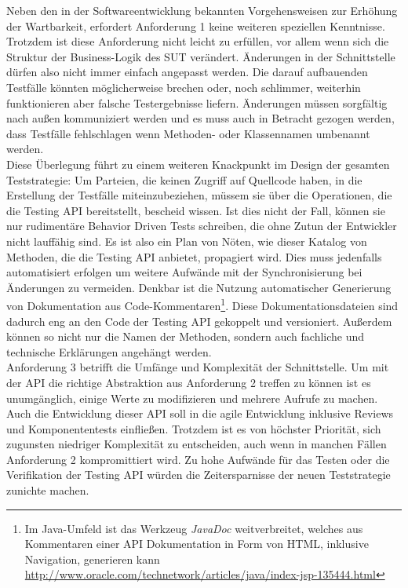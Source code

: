 Neben den in der Softwareentwicklung bekannten Vorgehensweisen zur Erhöhung der Wartbarkeit, erfordert Anforderung 1 keine weiteren speziellen Kenntnisse. Trotzdem ist diese Anforderung nicht leicht zu erfüllen, vor allem wenn sich die Struktur der Business-Logik des \Gls{SUT} verändert. Änderungen in der Schnittstelle dürfen also nicht immer einfach angepasst werden. Die darauf aufbauenden Testfälle könnten möglicherweise brechen oder, noch schlimmer, weiterhin funktionieren aber falsche Testergebnisse liefern. Änderungen müssen sorgfältig nach außen kommuniziert werden und es muss auch in Betracht gezogen werden, dass Testfälle fehlschlagen wenn Methoden- oder Klassennamen umbenannt werden.\\
Diese Überlegung führt zu einem weiteren Knackpunkt im Design der gesamten Teststrategie: Um Parteien, die keinen Zugriff auf Quellcode haben, in die Erstellung der Testfälle miteinzubeziehen, müssem sie über die Operationen, die die Testing API bereitstellt, bescheid wissen. Ist dies nicht der Fall, können sie nur rudimentäre Behavior Driven Tests schreiben, die ohne Zutun der Entwickler nicht lauffähig sind. Es ist also ein Plan von Nöten, wie dieser Katalog von Methoden, die die Testing API anbietet, propagiert wird. Dies muss jedenfalls automatisiert erfolgen um weitere Aufwände mit der Synchronisierung bei Änderungen zu vermeiden. Denkbar ist die Nutzung automatischer Generierung von Dokumentation aus Code-Kommentaren\footnote{Im Java-Umfeld ist das Werkzeug \textit{JavaDoc} weitverbreitet, welches aus Kommentaren einer API Dokumentation in Form von HTML, inklusive Navigation, generieren kann \url{http://www.oracle.com/technetwork/articles/java/index-jsp-135444.html}}. Diese Dokumentationsdateien sind dadurch eng an den Code der Testing API gekoppelt und versioniert. Außerdem können so nicht nur die Namen der Methoden, sondern auch fachliche und technische Erklärungen angehängt werden.\\
Anforderung 3 betrifft die Umfänge und Komplexität der Schnittstelle. Um mit der API die richtige Abstraktion aus Anforderung 2 treffen zu können ist es unumgänglich, einige Werte zu modifizieren und mehrere Aufrufe zu machen. Auch die Entwicklung dieser API soll in die agile Entwicklung inklusive \Glspl{Review} und Komponententests einfließen. Trotzdem ist es von höchster Priorität, sich zugunsten niedriger Komplexität zu entscheiden, auch wenn in manchen Fällen Anforderung 2 kompromittiert wird. Zu hohe Aufwände für das Testen oder die Verifikation der Testing API würden die Zeitersparnisse der neuen Teststrategie zunichte machen.

